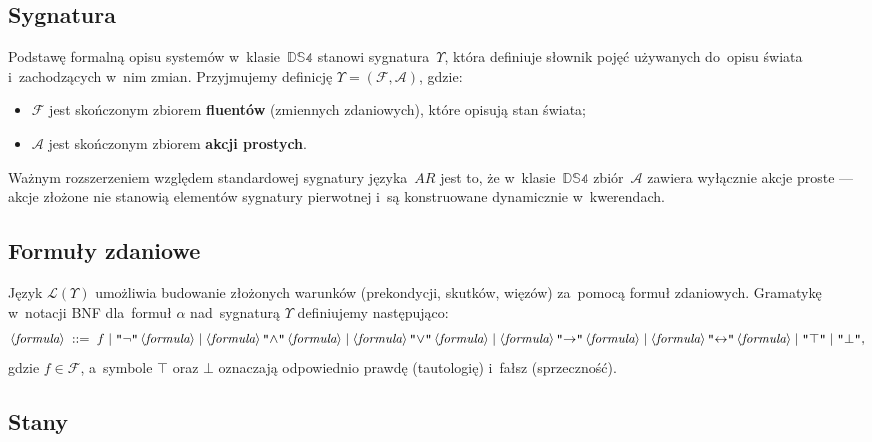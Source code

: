 \documentclass[11pt,a4paper]{article}
\newcommand{\bnfchar}[1]{\texttt{\textquotedbl#1\textquotedbl}}
\newcommand{\bnfsym}[1]{\langle \textit{#1} \rangle}
\theoremstyle{definition}
\begin{document}
\subsection{Sygnatura}

Podstawę formalną opisu systemów w~klasie~$\mathbb{DS4}$ stanowi sygnatura~$\Upsilon$, która definiuje słownik pojęć używanych do~opisu świata i~zachodzących w~nim zmian. Przyjmujemy definicję $\Upsilon = (\mathcal{F}, \mathcal{A})$, gdzie:
\begin{itemize}
  \item $\mathcal{F}$ jest skończonym zbiorem \textbf{fluentów} (zmiennych zdaniowych), które opisują stan świata;
  \item $\mathcal{A}$ jest skończonym zbiorem \textbf{akcji prostych}.
\end{itemize}
Ważnym rozszerzeniem względem standardowej sygnatury języka~$AR$ jest to, że w~klasie~$\mathbb{DS4}$ zbiór~$\mathcal{A}$ zawiera wyłącznie akcje proste --- akcje złożone nie stanowią elementów sygnatury pierwotnej i~są konstruowane dynamicznie w~kwerendach.

\subsection{Formuły zdaniowe}

Język $\mathcal{L}(\Upsilon)$ umożliwia budowanie złożonych warunków (prekondycji, skutków, więzów) za~pomocą formuł zdaniowych. Gramatykę w~notacji BNF dla~formuł $\alpha$ nad~sygnaturą $\Upsilon$ definiujemy następująco:
\[
  \bnfsym{formula} \;::=\; f
    \mid \bnfchar{$\neg$}\,\bnfsym{formula}
    \mid \bnfsym{formula}\,\bnfchar{$\land$}\,\bnfsym{formula}
    \mid \bnfsym{formula}\,\bnfchar{$\lor$}\,\bnfsym{formula}
    \mid \bnfsym{formula}\,\bnfchar{$\to$}\,\bnfsym{formula}
    \mid \bnfsym{formula}\,\bnfchar{$\leftrightarrow$}\,\bnfsym{formula}
    \mid \bnfchar{$\top$}
    \mid \bnfchar{$\bot$},
\]
gdzie $f \in \mathcal{F}$, a~symbole $\top$ oraz $\bot$ oznaczają odpowiednio prawdę (tautologię) i~fałsz (sprzeczność).

\subsection{Stany}
\end{document}
